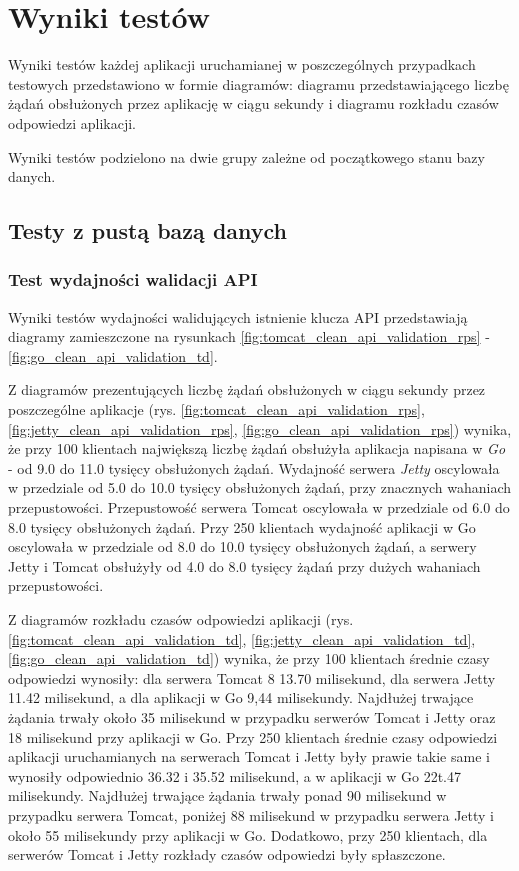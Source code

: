 \chapter{Wyniki testów}
Wyniki testów każdej aplikacji uruchamianej w poszczególnych przypadkach  testowych przedstawiono w formie diagramów: diagramu przedstawiającego liczbę żądań obsłużonych przez aplikację w ciągu sekundy i diagramu rozkładu czasów odpowiedzi aplikacji.

Wyniki testów podzielono na dwie grupy zależne  od początkowego stanu bazy danych.

\section{Testy z pustą bazą danych}

\subsection{Test wydajności walidacji API}
Wyniki testów wydajności walidujących istnienie klucza API przedstawiają diagramy zamieszczone na rysunkach \ref{fig:tomcat_clean_api_validation_rps} - \ref{fig:go_clean_api_validation_td}.

Z diagramów prezentujących liczbę żądań obsłużonych w ciągu sekundy przez poszczególne aplikacje (rys. \ref{fig:tomcat_clean_api_validation_rps}, \ref{fig:jetty_clean_api_validation_rps}, \ref{fig:go_clean_api_validation_rps}) wynika, że przy 100 klientach największą liczbę żądań obsłużyła aplikacja napisana w \textsl{Go} - od 9.0 do 11.0 tysięcy obsłużonych żądań. Wydajność serwera \textsl{Jetty} oscylowała w przedziale od 5.0 do 10.0 tysięcy obsłużonych żądań, przy znacznych wahaniach przepustowości. Przepustowość serwera Tomcat oscylowała w przedziale od 6.0 do 8.0 tysięcy obsłużonych żądań. Przy 250 klientach wydajność aplikacji w Go oscylowała w przedziale od 8.0 do 10.0 tysięcy obsłużonych żądań, a serwery Jetty i Tomcat obsłużyły od 4.0 do 8.0 tysięcy żądań przy dużych wahaniach przepustowości.      

Z diagramów rozkładu czasów odpowiedzi aplikacji (rys. \ref{fig:tomcat_clean_api_validation_td}, \ref{fig:jetty_clean_api_validation_td}, \ref{fig:go_clean_api_validation_td}) wynika, że przy 100 klientach średnie czasy odpowiedzi wynosiły: dla serwera Tomcat 8 13.70 milisekund, dla serwera Jetty 11.42 milisekund, a dla aplikacji w Go 9,44 milisekundy. Najdłużej trwające żądania trwały około 35 milisekund w przypadku serwerów Tomcat i Jetty oraz 18 milisekund przy aplikacji w Go. Przy 250 klientach średnie czasy odpowiedzi aplikacji uruchamianych na serwerach Tomcat i Jetty były prawie takie same i wynosiły odpowiednio 36.32 i 35.52 milisekund, a w aplikacji w Go 22t.47 milisekundy. Najdłużej trwające żądania trwały ponad 90 milisekund w przypadku serwera Tomcat, poniżej 88 milisekund w przypadku serwera Jetty i około 55 milisekundy przy aplikacji w Go. Dodatkowo, przy 250 klientach, dla serwerów Tomcat i Jetty rozkłady czasów odpowiedzi były spłaszczone. 

